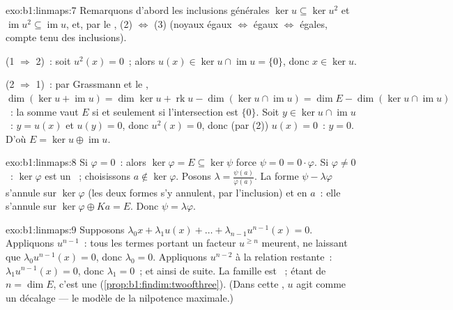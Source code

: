 \begin{solution}{exo:b1:linmaps:7}
Remarquons d'abord les inclusions générales $\ker u \subseteq \ker u^2$ et
$\operatorname{im} u^2 \subseteq \operatorname{im} u$, et, par le
, (2) $\iff$ (3) (noyaux égaux $\iff$  égaux
$\iff$  égales, compte tenu des inclusions).

(1 $\Rightarrow$ 2)~: soit $u^2(x) = 0$~; alors $u(x) \in \ker u \cap
\operatorname{im} u = \{0\}$, donc $x \in \ker u$.

(2 $\Rightarrow$ 1)~: par Grassmann et le , $\dim(\ker u +
\operatorname{im} u) = \dim\ker u + \operatorname{rk} u -
\dim(\ker u \cap \operatorname{im} u) = \dim E - \dim(\ker u \cap
\operatorname{im} u)$~: la somme vaut $E$ si et seulement si l'intersection est
$\{0\}$. Soit $y \in \ker u \cap \operatorname{im} u$~: $y = u(x)$ et
$u(y) = 0$, donc $u^2(x) = 0$, donc (par (2)) $u(x) = 0$~: $y = 0$. D'où
$E = \ker u \oplus \operatorname{im} u$.
\end{solution}

\begin{solution}{exo:b1:linmaps:8}
Si $\varphi = 0$~: alors $\ker\varphi = E \subseteq \ker\psi$ force
$\psi = 0 = 0\cdot\varphi$. Si $\varphi \neq 0$~: $\ker\varphi$ est un
~; choisissons $a \notin \ker\varphi$. Posons $\lambda =
\frac{\psi(a)}{\varphi(a)}$. La forme $\psi - \lambda\varphi$
s'annule sur $\ker\varphi$ (les deux formes s'y annulent, par l'inclusion) et en $a$~:
elle s'annule sur $\ker\varphi \oplus Ka = E$. Donc $\psi =
\lambda\varphi$.
\end{solution}

\begin{solution}{exo:b1:linmaps:9}
Supposons $\lambda_0 x + \lambda_1 u(x) + \dots + \lambda_{n-1}
u^{n-1}(x) = 0$. Appliquons $u^{n-1}$~: tous les termes portant un facteur $u^{\geq
n}$ meurent, ne laissant que $\lambda_0 u^{n-1}(x) = 0$, donc $\lambda_0 = 0$.
Appliquons $u^{n-2}$ à la relation restante~: $\lambda_1 u^{n-1}(x) =
0$, donc $\lambda_1 = 0$~; et ainsi de suite. La famille est ~; étant de 
$n = \dim E$, c'est une  (\cref{prop:b1:findim:twoofthree}). (Dans
cette , $u$ agit comme un décalage --- le modèle de la nilpotence
maximale.)
\end{solution}

